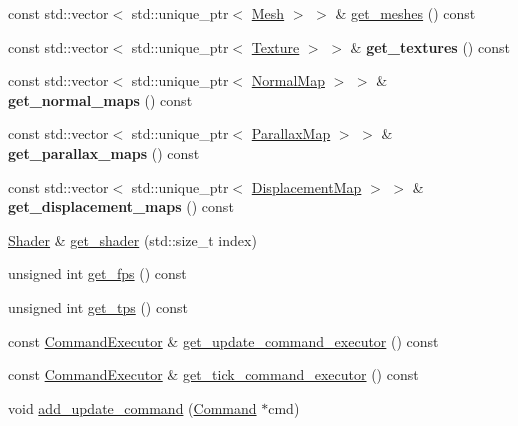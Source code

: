 \begin{DoxyCompactItemize}
\item 
const std\+::vector$<$ std\+::unique\+\_\+ptr$<$ \mbox{\hyperlink{class_mesh}{Mesh}} $>$ $>$ \& \mbox{\hyperlink{class_engine_a0cab1935798c43bd3a9f5ed3a4de1f04}{get\+\_\+meshes}} () const
\item 
\mbox{\label{class_engine_aba2ff0632dc6d5b5e6a798b7154d3b13}} 
const std\+::vector$<$ std\+::unique\+\_\+ptr$<$ \mbox{\hyperlink{class_texture}{Texture}} $>$ $>$ \& {\bfseries get\+\_\+textures} () const
\item 
\mbox{\label{class_engine_ae5e2a4ccea1d11ed4d6b42066130cda5}} 
const std\+::vector$<$ std\+::unique\+\_\+ptr$<$ \mbox{\hyperlink{class_normal_map}{Normal\+Map}} $>$ $>$ \& {\bfseries get\+\_\+normal\+\_\+maps} () const
\item 
\mbox{\label{class_engine_a58f16cc74f45b8511ad7420169bd7e2f}} 
const std\+::vector$<$ std\+::unique\+\_\+ptr$<$ \mbox{\hyperlink{class_parallax_map}{Parallax\+Map}} $>$ $>$ \& {\bfseries get\+\_\+parallax\+\_\+maps} () const
\item 
\mbox{\label{class_engine_a7518ed8e410e6cc01ed05c116c146dd5}} 
const std\+::vector$<$ std\+::unique\+\_\+ptr$<$ \mbox{\hyperlink{class_displacement_map}{Displacement\+Map}} $>$ $>$ \& {\bfseries get\+\_\+displacement\+\_\+maps} () const
\item 
\mbox{\hyperlink{class_shader}{Shader}} \& \mbox{\hyperlink{class_engine_af92650e3ce3cabf7e527c92ae4917702}{get\+\_\+shader}} (std\+::size\+\_\+t index)
\item 
unsigned int \mbox{\hyperlink{class_engine_a9b33dc683a75b1a3deb14a7280003b38}{get\+\_\+fps}} () const
\item 
unsigned int \mbox{\hyperlink{class_engine_afac8cc0ad1a0c97024dc61683588f22c}{get\+\_\+tps}} () const
\item 
const \mbox{\hyperlink{class_command_executor}{Command\+Executor}} \& \mbox{\hyperlink{class_engine_ab53fa08b25bde47cf3fd63956669fc72}{get\+\_\+update\+\_\+command\+\_\+executor}} () const
\item 
const \mbox{\hyperlink{class_command_executor}{Command\+Executor}} \& \mbox{\hyperlink{class_engine_a457c2c3adbc7baa8b2903b139882fc79}{get\+\_\+tick\+\_\+command\+\_\+executor}} () const
\item 
void \mbox{\hyperlink{class_engine_a50fc8b735ed53d1157316b35959cad00}{add\+\_\+update\+\_\+command}} (\mbox{\hyperlink{class_command}{Command}} $\ast$cmd)

\end{DoxyCompactItemize}
